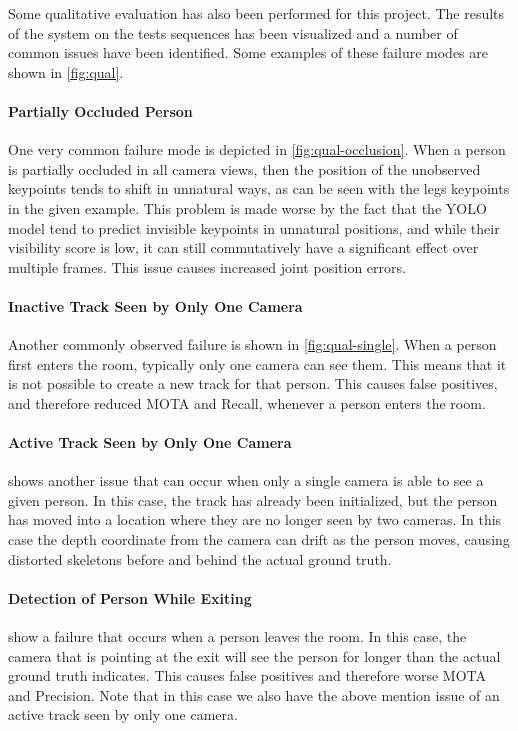 Some qualitative evaluation has also been performed for this project. The results of the system on the tests sequences has been visualized and a number of common issues have been identified. Some examples of these failure modes are shown in \cref{fig:qual}.

\paragraph{Partially Occluded Person}
One very common failure mode is depicted in \cref{fig:qual-occlusion}. When a person is partially occluded in all camera views, then the position of the unobserved keypoints tends to shift in unnatural ways, as can be seen with the legs keypoints in the given example. This problem is made worse by the fact that the YOLO model tend to predict invisible keypoints in unnatural positions, and while their visibility score is low, it can still commutatively have a significant effect over multiple frames. This issue causes increased joint position errors.

\paragraph{Inactive Track Seen by Only One Camera}
Another commonly observed failure is shown in \cref{fig:qual-single}. When a person first enters the room, typically only one camera can see them. This means that it is not possible to create a new track for that person. This causes false positives, and therefore reduced MOTA and Recall, whenever a person enters the room.

\paragraph{Active Track Seen by Only One Camera}
 shows another issue that can occur when only a single camera is able to see a given person. In this case, the track has already been initialized, but the person has moved into a location where they are no longer seen by two cameras. In this case the depth coordinate from the camera can drift as the person moves, causing distorted skeletons before and behind the actual ground truth.

\paragraph{Detection of Person While Exiting}
 show a failure that occurs when a person leaves the room. In this case, the camera that is pointing at the exit will see the person for longer than the actual ground truth indicates. This causes false positives and therefore worse MOTA and Precision. Note that in this case we also have the above mention issue of an active track seen by only one camera.
